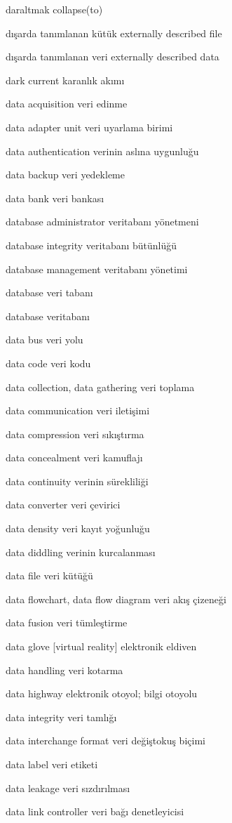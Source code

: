 \documentclass[12pt,fleqn]{article}\usepackage{../../common}
\begin{document}
daraltmak collapse(to)

dışarda tanımlanan kütük externally described file

dışarda tanımlanan veri externally described data

dark current karanlık akımı

data acquisition veri edinme

data adapter unit veri uyarlama birimi

data authentication verinin aslına uygunluğu

data backup veri yedekleme

data bank veri bankası

database administrator veritabanı yönetmeni

database integrity veritabanı bütünlüğü

database management veritabanı yönetimi

database veri tabanı

database veritabanı

data bus veri yolu

data code veri kodu

data collection, data gathering veri toplama

data communication veri iletişimi

data compression veri sıkıştırma

data concealment veri kamuflajı

data continuity verinin sürekliliği

data converter veri çevirici

data density veri kayıt yoğunluğu

data diddling verinin kurcalanması

data file veri kütüğü

data flowchart, data flow diagram veri akış çizeneği

data fusion veri tümleştirme

data glove [virtual reality] elektronik eldiven

data handling veri kotarma

data highway elektronik otoyol; bilgi otoyolu

data integrity veri tamlığı

data interchange format veri değiştokuş biçimi

data label veri etiketi

data leakage veri sızdırılması

data link controller veri bağı denetleyicisi
\end{document}
